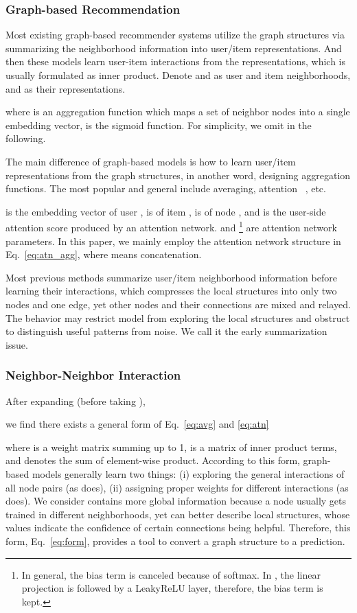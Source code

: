 \documentclass[sigconf]{acmart}
\newcommand{\new}[1]{{\color{black} #1}}
\begin{document}
\subsubsection{Graph-based Recommendation} \new{Most existing graph-based recommender systems utilize the graph structures via summarizing the neighborhood information into user/item representations. And then these models learn user-item interactions from the representations, which is usually formulated as inner product.} Denote  and  as user and item neighborhoods,  and  as their representations.

where  is an aggregation function which maps a set of neighbor nodes into a single embedding vector,  is the sigmoid function. For simplicity, we omit  in the following.

\new{The main difference of graph-based models is how to learn user/item representations from the graph structures, in another word, designing aggregation functions. The most popular and general  include averaging, attention ~\cite{wang2018dkn,zhang2016collaborative,wang2018ripplenet}, etc.}

 is the embedding vector of user ,  is of item ,  is of node , and  is the user-side attention score produced by an attention network. \new{ and \footnote{In general, the bias term is canceled because of softmax. In \cite{velickovic2017graph}, the linear projection is followed by a LeakyReLU layer, therefore, the bias term is kept.} are attention network parameters. 
In this paper, we mainly employ the attention network structure in Eq.~\eqref{eq:atn_agg}, where  means concatenation.}

\new{Most previous methods summarize user/item neighborhood information before learning their interactions, which compresses the local structures into only two nodes and one edge, yet other nodes and their connections are mixed and relayed. The behavior may restrict model from exploring the local structures and obstruct to distinguish useful patterns from noise. We call it the early summarization issue.}

\subsubsection{Neighbor-Neighbor Interaction} After expanding  (before taking ), 

we find there exists a general form of Eq.~\eqref{eq:avg} and \eqref{eq:atn}

where  is a weight matrix summing up to 1,  is a matrix of inner product terms, and  denotes the sum of element-wise product. According to this form, graph-based models generally learn two things: (i) exploring the general interactions of all node pairs (as  does), (ii) assigning proper weights for different interactions (as  does). \new{We consider  contains more global information because a node usually gets trained in different neighborhoods, yet  can better describe local structures, whose values indicate the confidence of certain connections being helpful. Therefore, this form, Eq.~\eqref{eq:form}, provides a tool to convert a graph structure to a prediction.}
\end{document}
